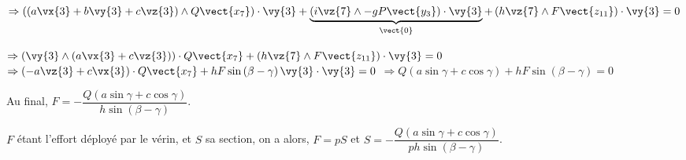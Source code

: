\begin{corrige}
$
\Rightarrow
\left(\left(a\vx{3}+b\vy{3}+c\vz{3}\right)\wedge Q\vect{x_7} \right) \cdot \vy{3} 
+ \underbrace{\left( i\vz{7}\wedge -gP\vect{y_3} \right) \cdot \vy{3}}_{\vect{0}}
+ \left(h\vz{7}\wedge F\vect{z_{11}} \right)  \cdot \vy{3}=0
$

$
\Rightarrow
\left(\vy{3} \wedge \left(a\vx{3}+c\vz{3}\right)  \right) \cdot   Q\vect{x_7}
+ \left(h\vz{7}\wedge F\vect{z_{11}} \right)  \cdot \vy{3}=0
$
$
\Rightarrow
\left( -a\vz{3}+c\vx{3}\right)   \cdot   Q\vect{x_7}
+ hF \sin\left(\beta - \gamma\right)\vy{3}  \cdot \vy{3}=0
$
$
\Rightarrow
Q\left( a\sin \gamma+c\cos\gamma \right)  
+ hF \sin\left(\beta - \gamma\right)=0
$

Au final, $F= - \dfrac{Q\left( a\sin \gamma+c\cos\gamma \right)  }{ h \sin\left(\beta - \gamma\right)}$.

$F$ étant l'effort déployé par le vérin, et $S$ sa section, on a alors, $F=pS$ et 
$S= - \dfrac{Q\left( a\sin \gamma+c\cos\gamma \right)  }{p h \sin\left(\beta - \gamma\right)}$.

\end{corrige}
\else
\fi